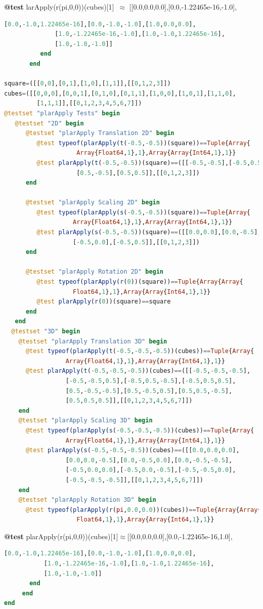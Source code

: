 \documentclass[a4paper,12pt]{article}
\begin{document}
\hspace{2cm} \textbf{@test}    larApply(r(pi,0,0))(cubes)[1]\ $\approx$ [[0.0,0.0,0.0],[0.0,-1.22465e-16,-1.0],
\begin{lstlisting}[language=Julia]
              [0.0,-1.0,1.22465e-16],[0.0,-1.0,-1.0],[1.0,0.0,0.0],
              [1.0,-1.22465e-16,-1.0],[1.0,-1.0,1.22465e-16],
              [1.0,-1.0,-1.0]]
          end
       end

square=([[0,0],[0,1],[1,0],[1,1]],[[0,1,2,3]])
cubes=([[0,0,0],[0,0,1],[0,1,0],[0,1,1],[1,0,0],[1,0,1],[1,1,0],
         [1,1,1]],[[0,1,2,3,4,5,6,7]])
@testset "plarApply Tests" begin
   @testset "2D" begin	
      @testset "plarApply Translation 2D" begin
         @test typeof(plarApply(t(-0.5,-0.5))(square))==Tuple{Array{
                    Array{Float64,1},1},Array{Array{Int64,1},1}}
         @test plarApply(t(-0.5,-0.5))(square)==([[-0.5,-0.5],[-0.5,0.5],
                    [0.5,-0.5],[0.5,0.5]],[[0,1,2,3]])
      end 
	
      @testset "plarApply Scaling 2D" begin
         @test typeof(plarApply(s(-0.5,-0.5))(square))==Tuple{Array{
                   Array{Float64,1},1},Array{Array{Int64,1},1}}
         @test plarApply(s(-0.5,-0.5))(square)==([[0.0,0.0],[0.0,-0.5],
                   [-0.5,0.0],[-0.5,0.5]],[[0,1,2,3]])
      end
	
      @testset "plarApply Rotation 2D" begin
         @test typeof(plarApply(r(0))(square))==Tuple{Array{Array{
                   Float64,1},1},Array{Array{Int64,1},1}}
         @test plarApply(r(0))(square)==square
      end
   end
  @testset "3D" begin
    @testset "plarApply Translation 3D" begin
      @test typeof(plarApply(t(-0.5,-0.5,-0.5))(cubes))==Tuple{Array{
                 Array{Float64,1},1},Array{Array{Int64,1},1}}
      @test plarApply(t(-0.5,-0.5,-0.5))(cubes)==([[-0.5,-0.5,-0.5],
                 [-0.5,-0.5,0.5],[-0.5,0.5,-0.5],[-0.5,0.5,0.5],
                 [0.5,-0.5,-0.5],[0.5,-0.5,0.5],[0.5,0.5,-0.5],
                 [0.5,0.5,0.5]],[[0,1,2,3,4,5,6,7]])
    end 
    @testset "plarApply Scaling 3D" begin
      @test typeof(plarApply(s(-0.5,-0.5,-0.5))(cubes))==Tuple{Array{
                 Array{Float64,1},1},Array{Array{Int64,1},1}}
      @test plarApply(s(-0.5,-0.5,-0.5))(cubes)==([[0.0,0.0,0.0],
                 [0.0,0.0,-0.5],[0.0,-0.5,0.0],[0.0,-0.5,-0.5],
                 [-0.5,0.0,0.0],[-0.5,0.0,-0.5],[-0.5,-0.5,0.0],
                 [-0.5,-0.5,-0.5]],[[0,1,2,3,4,5,6,7]])
    end
    @testset "plarApply Rotation 3D" begin
      @test typeof(plarApply(r(pi,0.0,0.0))(cubes))==Tuple{Array{Array{
                    Float64,1},1},Array{Array{Int64,1},1}}
 \end{lstlisting}
\hspace{1.35cm} \textbf{@test} plarApply(r(pi,0,0))(cubes)[1]$\approx$[[0.0,0.0,0.0],[0.0,-1.22465e-16,1.0],
\begin{lstlisting}[language=Julia]
           [0.0,-1.0,1.22465e-16],[0.0,-1.0,-1.0],[1.0,0.0,0.0],
           [1.0,-1.22465e-16,-1.0],[1.0,-1.0,1.22465e-16],
           [1.0,-1.0,-1.0]]
       end
     end
end
\end{lstlisting}
\end{document}
